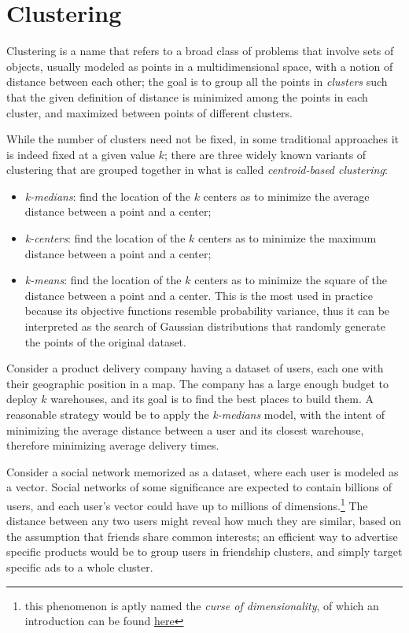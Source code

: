 \chapter{Clustering}\label{sec:clustering}

\newcommand{\cost}{\mathcal{C}\textit{ost}}

Clustering is a name that refers to a broad class of problems that involve sets of objects, usually modeled as points in a multidimensional space, with a notion of distance between each other; the goal is to group all the points in \emph{clusters} such that the given definition of distance is minimized among the points in each cluster, and maximized between points of different clusters.

While the number of clusters need not be fixed, in some traditional approaches it is indeed fixed at a given value $k$; there are three widely known variants of clustering that are grouped together in what is called \emph{centroid-based clustering}:
\begin{itemize}\label{clust-k-algs}
    \item \textit{k-medians}: find the location of the $k$ centers as to minimize the average distance between a point and a center;
    \item \textit{k-centers}: find the location of the $k$ centers as to minimize the maximum distance between a point and a center;
    \item \textit{k-means}: find the location of the $k$ centers as to minimize the square of the distance between a point and a center. This is the most used in practice because its objective functions resemble probability variance, thus it can be interpreted as the search of Gaussian distributions that randomly generate the points of the original dataset.
\end{itemize}

\begin{example}
    Consider a product delivery company having a dataset of users, each one with their geographic position in a map. The company has a large enough budget to deploy $k$ warehouses, and its goal is to find the best places to build them. A reasonable strategy would be to apply the \emph{k-medians} model, with the intent of minimizing the average distance between a user and its closest warehouse, therefore minimizing average delivery times.
\end{example}

\begin{example}
    Consider a social network memorized as a dataset, where each user is modeled as a vector. Social networks of some significance are expected to contain billions of users, and each user's vector could have up to millions of dimensions.\footnote{this phenomenon is aptly named the \emph{curse of dimensionality}, of which an introduction can be found \href{https://en.wikipedia.org/wiki/Curse_of_dimensionality}{here}}
    The distance between any two users might reveal how much they are similar, based on the assumption that friends share common interests; an efficient way to advertise specific products would be to group users in friendship clusters, and simply target specific ads to a whole cluster.
\end{example}

